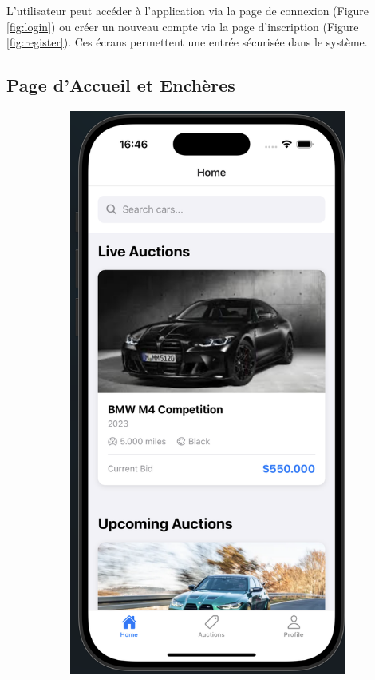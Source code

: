 L'utilisateur peut accéder à l'application via la page de connexion (Figure \ref{fig:login}) ou créer un nouveau compte via la page d'inscription (Figure \ref{fig:register}). Ces écrans permettent une entrée sécurisée dans le système.

\subsection{Page d'Accueil et Enchères}

\begin{figure}[H]
    \centering
    \begin{subfigure}[b]{0.48\textwidth}
        \includegraphics[width=\textwidth]{images/home page with live auctions.png}

\end{subfigure}
\end{figure}
